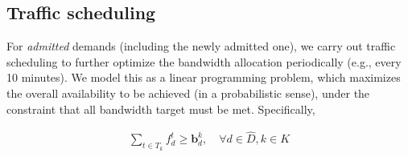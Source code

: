 \documentclass[sigconf]{acmart}
\begin{document}



\subsection{Traffic scheduling} \label{TE}

For \textit{admitted} demands (including the newly admitted one), we carry out traffic scheduling to further optimize the bandwidth allocation periodically (e.g., every 10 minutes).
We model this as a linear programming problem, which maximizes the overall availability to be achieved (in a probabilistic sense), under the constraint that all bandwidth target must be met. Specifically, 

\begin{eqnarray} \label{Smaller}
 \sum_{t\in T_{k}} f_{d}^t \ge \mathbf{b}^k_d, \quad  \forall d \in \hat{D}, k \in K
\end{eqnarray}



\end{document}
